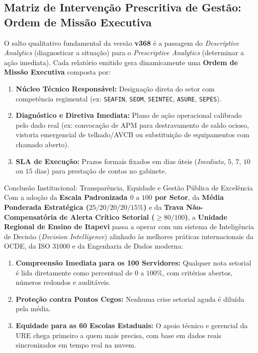 \documentclass[9pt,a4paper]{extarticle}
\begin{document}
\subsection{Matriz de Intervenção Prescritiva de Gestão: Ordem de Missão Executiva}
O salto qualitativo fundamental da versão \textbf{v368} é a passagem do \emph{Descriptive Analytics} (diagnosticar a situação) para o \emph{Prescriptive Analytics} (determinar a ação imediata). Cada relatório emitido gera dinamicamente uma \textbf{Ordem de Missão Executiva} composta por:
\begin{enumerate}[leftmargin=1.5em, itemsep=2pt]
    \item \textbf{Núcleo Técnico Responsável:} Designação direta do setor com competência regimental (ex: \texttt{SEAFIN}, \texttt{SEOM}, \texttt{SEINTEC}, \texttt{ASURE}, \texttt{SEPES}).
    \item \textbf{Diagnóstico e Diretiva Imediata:} Plano de ação operacional calibrado pelo dado real (ex: convocação de APM para destravamento de saldo ocioso, vistoria emergencial de telhado/AVCB ou substituição de equipamentos com chamado aberto).
    \item \textbf{SLA de Execução:} Prazos formais fixados em dias úteis (\emph{Imediato}, $5$, $7$, $10$ ou $15$ dias) para prestação de contas no gabinete.
\end{enumerate}

\begin{execbox}{Conclusão Institucional: Transparência, Equidade e Gestão Pública de Excelência}
Com a adoção da \textbf{Escala Padronizada $0\text{ a }100$ por Setor}, da \textbf{Média Ponderada Estratégica ($25/20/20/20/15\%$)} e da \textbf{Trava Não-Compensatória de Alerta Crítico Setorial ($\ge 80/100$)}, a \textbf{Unidade Regional de Ensino de Itapevi} passa a operar com um sistema de Inteligência de Decisão (\emph{Decision Intelligence}) alinhado às melhores práticas internacionais da OCDE, da ISO 31000 e da Engenharia de Dados moderna:
\begin{enumerate}[nosep, leftmargin=1.5em]
    \item \textbf{Compreensão Imediata para os 100 Servidores:} Qualquer nota setorial é lida diretamente como percentual de $0$ a $100\%$, com critérios abertos, números redondos e auditáveis.
    \item \textbf{Proteção contra Pontos Cegos:} Nenhuma crise setorial aguda é diluída pela média.
    \item \textbf{Equidade para as 60 Escolas Estaduais:} O apoio técnico e gerencial da URE chega primeiro a quem mais precisa, com base em dados reais sincronizados em tempo real na nuvem.
\end{enumerate}
\end{execbox}
\end{document}
